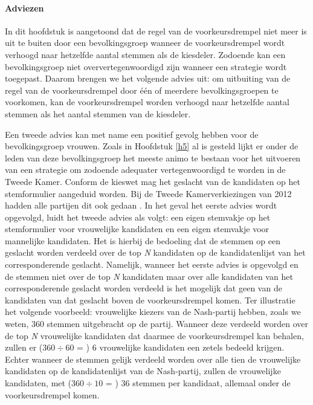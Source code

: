 \paragraph*{Adviezen}
In dit hoofdstuk is aangetoond dat de regel van de voorkeursdrempel niet meer is uit te buiten door een bevolkingsgroep wanneer de voorkeursdrempel wordt verhoogd naar hetzelfde aantal stemmen als de kiesdeler. Zodoende kan een bevolkingsgroep niet oververtegenwoordigd zijn wanneer een strategie wordt toegepast. Daarom brengen we het volgende advies uit: om uitbuiting van de regel van de voorkeursdrempel door één of meerdere bevolkingsgroepen te voorkomen, kan de voorkeursdrempel worden verhoogd naar hetzelfde aantal stemmen als het aantal stemmen van de kiesdeler. 

Een tweede advies kan met name een positief gevolg hebben voor de bevolkingsgroep vrouwen. Zoals in Hoofdstuk \ref{h5} al is gesteld lijkt er onder de leden van deze bevolkingsgroep het meeste animo te bestaan voor het uitvoeren van een strategie om zodoende adequater vertegenwoordigd te worden in de Tweede Kamer. Conform de kieswet \citeyearpar{kieswetje} mag het geslacht van de kandidaten op het stemformulier aangeduid worden. Bij de Tweede Kamerverkiezingen van 2012 hadden alle partijen dit ook gedaan \citep{Kiesraad_kandidatenlijsten}. In het geval het eerste advies wordt opgevolgd, luidt het tweede advies als volgt: een eigen stemvakje op het stemformulier voor vrouwelijke kandidaten en een eigen stemvakje voor mannelijke kandidaten. Het is hierbij de bedoeling dat de stemmen op een geslacht worden verdeeld over de top \textit{N} kandidaten op de kandidatenlijst van het corresponderende geslacht. Namelijk, wanneer het eerste advies is opgevolgd en de stemmen niet over de top \textit{N} kandidaten maar over alle kandidaten van het corresponderende geslacht worden verdeeld is het mogelijk dat geen van de kandidaten van dat geslacht boven de voorkeursdrempel komen. Ter illustratie het volgende voorbeeld: vrouwelijke kiezers van de Nash-partij hebben, zoals we weten, 360 stemmen uitgebracht op de partij. Wanneer deze verdeeld worden over de top \textit{N} vrouwelijke kandidaten dat daarmee de voorkeursdrempel kan behalen, zullen er ($360\div60$ = ) 6 vrouwelijke kandidaten een zetels bedeeld krijgen. Echter wanneer de stemmen gelijk verdeeld worden over alle tien de vrouwelijke kandidaten op de kandidatenlijst van de Nash-partij, zullen de vrouwelijke kandidaten, met ($360\div10$ = ) 36 stemmen per kandidaat, allemaal onder de voorkeursdrempel komen. 

